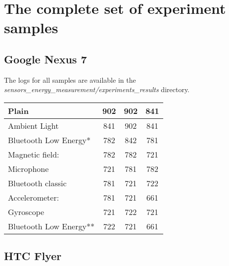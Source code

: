 \section{The complete set of experiment samples}
\subsection{Google Nexus 7}	

The logs for all samples are available in the \textit{sensors\_energy\_measurement/experiments\_results} directory.

\begin{table}[H]
	\centering
    \begin{tabular}{| l | c | c | c |}
    \hline
    Plain                  & 902 & 902 & 841 \\ \hline
    Ambient Light          & 841 & 902 & 841\\ \hline
    Bluetooth Low Energy*  & 782 & 842 & 781 \\ \hline
    Magnetic field:        & 782 & 782 & 721\\ \hline
    Microphone             & 721 & 781 & 782 \\ \hline
    Bluetooth classic      & 781 & 721 & 722 \\ \hline
    Accelerometer:         & 781 & 721 & 661 \\ \hline
    Gyroscope              & 721 & 722 & 721 \\ \hline
    Bluetooth Low Energy** & 722 & 721 & 661 \\ \hline
    \end{tabular}
\end{table}

\subsection{HTC Flyer}	

